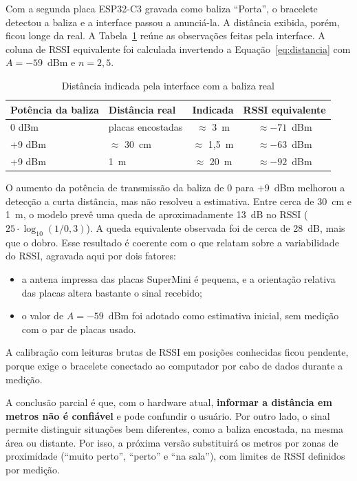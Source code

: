 Com a segunda placa ESP32-C3 gravada como baliza ``Porta'', o bracelete detectou a baliza e a interface passou a anunciá-la. A distância exibida, porém, ficou longe da real. A Tabela~\ref{tab:baliza-real} reúne as observações feitas pela interface. A coluna de RSSI equivalente foi calculada invertendo a Equação~\ref{eq:distancia} com $A=-59$~dBm e $n=2{,}5$.

\begin{table}[htb]
\centering
\caption{Distância indicada pela interface com a baliza real}
\label{tab:baliza-real}
\small
\begin{tabular}{p{3.3cm}p{3.2cm}cc}
\toprule
\textbf{Potência da baliza} & \textbf{Distância real} & \textbf{Indicada} & \textbf{RSSI equivalente} \\
\midrule
0 dBm & placas encostadas & $\approx$ 3~m & $\approx -71$~dBm \\
+9 dBm & $\approx$ 30~cm & $\approx$ 1,5~m & $\approx -63$~dBm \\
+9 dBm & 1~m & $\approx$ 20~m & $\approx -92$~dBm \\
\bottomrule
\end{tabular}
\normalsize
{}
\end{table}

O aumento da potência de transmissão da baliza de 0 para +9~dBm melhorou a detecção a curta distância, mas não resolveu a estimativa. Entre cerca de 30~cm e 1~m, o modelo prevê uma queda de aproximadamente 13~dB no RSSI ($25 \cdot \log_{10}(1/0{,}3)$). A queda equivalente observada foi de cerca de 28~dB, mais que o dobro. Esse resultado é coerente com o que  relatam sobre a variabilidade do RSSI, agravada aqui por dois fatores:
\begin{itemize}
    \item a antena impressa das placas SuperMini é pequena, e a orientação relativa das placas altera bastante o sinal recebido;
    \item o valor de $A=-59$~dBm foi adotado como estimativa inicial, sem medição com o par de placas usado.
\end{itemize}
A calibração com leituras brutas de RSSI em posições conhecidas ficou pendente, porque exige o bracelete conectado ao computador por cabo de dados durante a medição.

A conclusão parcial é que, com o hardware atual, \textbf{informar a distância em metros não é confiável} e pode confundir o usuário. Por outro lado, o sinal permite distinguir situações bem diferentes, como a baliza encostada, na mesma área ou distante. Por isso, a próxima versão substituirá os metros por zonas de proximidade (``muito perto'', ``perto'' e ``na sala''), com limites de RSSI definidos por medição.

